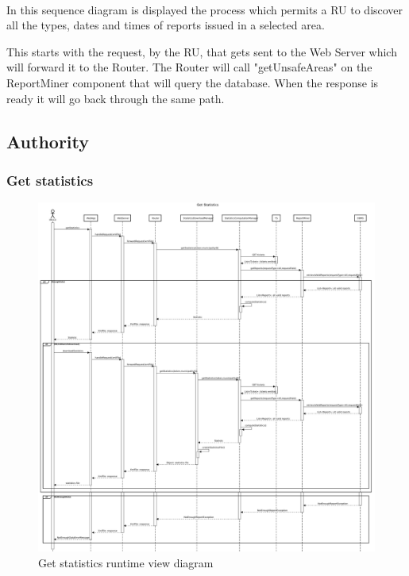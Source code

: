 					\paragraph{}
						In this sequence diagram is displayed the process which permits a RU to discover all the types, dates and times of reports issued in a selected area. 
						
						This starts with the request, by the RU, that gets sent to the Web Server which will forward it to the Router. The Router will call "getUnsafeAreas" on the ReportMiner component that will query the database. When the response is ready it will go back through the same path.
			\clearpage
			\subsection{Authority}
				\subsubsection{Get statistics}
					\begin{figure}[!h]
						\centering
						\includegraphics[width=\textwidth]{images/DD2/RuntimeView/Authority/GetStatistics.pdf}
						\caption{Get statistics runtime view diagram}
					\end{figure}
